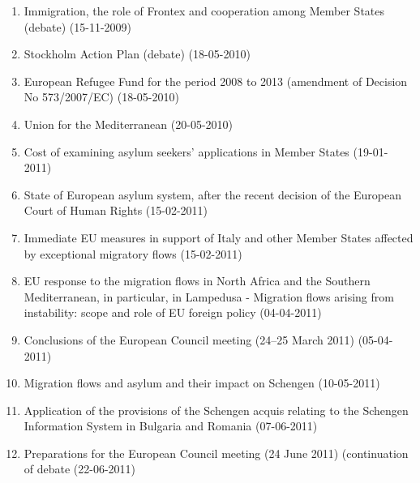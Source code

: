 \documentclass[output=paper]{langscibook}
\begin{document}
\label{ap:mori:1}

\begin{enumerate}[label = {Topic \arabic*:}, align = left]
\item Immigration, the role of Frontex and cooperation among Member States (debate) (15-11-2009)

\item Stockholm Action Plan (debate) (18-05-2010)

\item  European Refugee Fund for the period 2008 to 2013 (amendment of Decision No 573/2007/EC) (18-05-2010)

\item Union for the Mediterranean (20-05-2010)

\item Cost of examining asylum seekers’ applications in Member States (19-01-2011)

\item State of European asylum system, after the recent decision of the European Court of Human Rights (15-02-2011)

\item Immediate EU measures in support of Italy and other Member States affected by exceptional migratory flows (15-02-2011)

\item EU response to the migration flows in North Africa and the Southern Mediterranean, in particular, in Lampedusa - Migration flows arising from instability: scope and role of EU foreign policy (04-04-2011)

\item Conclusions of the European Council meeting (24--25 March 2011) (05-04-2011)

\item Migration flows and asylum and their impact on Schengen (10-05-2011)

\item Application of the provisions of the Schengen acquis relating to the Schengen Information System in Bulgaria and Romania (07-06-2011)

\item Preparations for the European Council meeting (24 June 2011) (continuation of debate (22-06-2011)
\end{enumerate}


\label{ap:mori:2}
\end{document}
